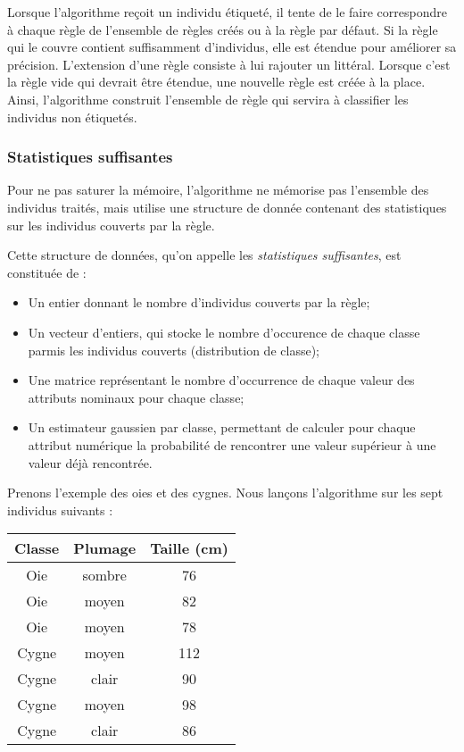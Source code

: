             Lorsque l’algorithme reçoit un individu étiqueté, il tente de le faire correspondre à chaque règle de l’ensemble de règles créés ou à la règle par défaut. Si la règle qui le couvre contient suffisamment d’individus, elle est étendue pour améliorer sa précision. L’extension d’une règle consiste à lui rajouter un littéral. Lorsque c’est la règle vide qui devrait être étendue, une nouvelle règle est créée à la place. Ainsi, l’algorithme construit l’ensemble de règle qui servira à classifier les individus non étiquetés.

        \subsubsection{Statistiques suffisantes}

            Pour ne pas saturer la mémoire, l’algorithme ne mémorise pas l’ensemble des individus traités, mais utilise une structure de donnée contenant des statistiques sur les individus couverts par la règle.

            Cette structure de données, qu’on appelle les \emph{statistiques suffisantes}, est constituée de :
            \begin{itemize}
                \item Un entier donnant le nombre d’individus couverts par la règle;
                \item Un vecteur d’entiers, qui stocke le nombre d’occurence de chaque classe parmis les individus couverts (distribution de classe);
                \item Une matrice représentant le nombre d'occurrence de chaque valeur des attributs nominaux pour chaque classe;
                \item Un estimateur gaussien par classe, permettant de calculer pour chaque attribut numérique la probabilité de rencontrer une valeur supérieur à une valeur déjà rencontrée.
            \end{itemize}

            Prenons l’exemple des oies et des cygnes. Nous lançons l'algorithme sur les sept individus suivants :

             \begin{table}[h]\centering
                \begin{tabular}{|ccc|}\hline
                    Classe&Plumage&Taille (cm)\\ \hline
                	Oie & sombre & 76 \\
                	Oie & moyen & 82 \\
                	Oie & moyen & 78 \\
                	Cygne & moyen & 112 \\
                	Cygne & clair & 90 \\
                	Cygne & moyen & 98 \\
                	Cygne & clair & 86 \\ \hline
                \end{tabular}
            \end{table}

